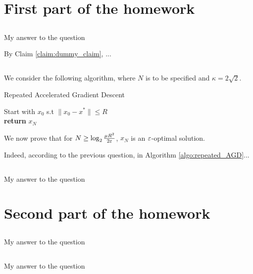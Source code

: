 \documentclass{article}
\numberwithin{equation}{subsection}
\begin{document}
\section*{First part of the homework}

\subsection{}
My answer to the question

By Claim \ref{claim:dummy_claim}, ...

\subsection{}
We consider the following algorithm, where $N$ is to be specified and $\kappa = 2 \sqrt{2}$.

\begin{algorithm}[H]
	\SetAlgoLined
	\caption{Repeated Accelerated Gradient Descent}\label{algo:repeated_AGD}
	Start with $x_0$ s.t $\|x_0 - x^*\| \leq R$ \\
	\textbf{return} $x_N$
\end{algorithm}

We now prove that for $N \geq \log_2 \frac{\mu R^2}{2 \varepsilon}$, $x_N$ is an $\varepsilon$-optimal solution.

Indeed, according to the previous question, in Algorithm \ref{algo:repeated_AGD}...

\subsection{}
My answer to the question



\section*{Second part of the homework}

\subsection{}
My answer to the question

\subsection{}
My answer to the question
\end{document}
